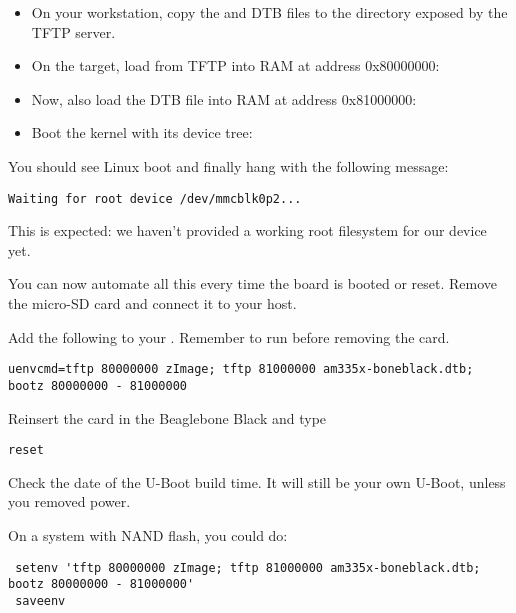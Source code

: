 \begin{itemize}

\item On your workstation, copy the  and DTB files to the
  directory exposed by the TFTP server.

\item On the target, load  from TFTP into RAM at address
  0x80000000:\\

\item Now, also load the DTB file into RAM at address 0x81000000:\\

\item Boot the kernel with its device tree:\\

\end{itemize}

You should see Linux boot and finally hang with the following message:

\begin{verbatim}
Waiting for root device /dev/mmcblk0p2...
\end{verbatim}

This is expected: we haven't provided a working root filesystem for
our device yet.

You can now automate all this every time the board is booted or
reset. Remove the micro-SD card and connect it to your host.

Add the following to your . Remember to run  before removing the card.

{\scriptsize
\begin{verbatim}
uenvcmd=tftp 80000000 zImage; tftp 81000000 am335x-boneblack.dtb; bootz 80000000 - 81000000
\end{verbatim}
}

Reinsert the card in the Beaglebone Black and type

{\scriptsize
\begin{verbatim}
reset
\end{verbatim}
}

Check the date of the U-Boot build time. It will still be your own U-Boot, unless you
removed power.

On a system with NAND flash, you could do:
{\scriptsize
\begin{verbatim}
 setenv 'tftp 80000000 zImage; tftp 81000000 am335x-boneblack.dtb; bootz 80000000 - 81000000'
 saveenv
\end{verbatim}
}

